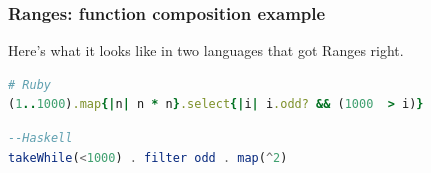 \documentclass{beamer}
\begin{document}
\begin{frame}[fragile]
\frametitle{Ranges: function composition example}

Here's what it looks like in two languages that got Ranges right.

\vspace{2em}


\vspace{1em}

\begin{lstlisting}[language=Ruby]
# Ruby
(1..1000).map{|n| n * n}.select{|i| i.odd? && (1000  > i)}
\end{lstlisting}

\begin{lstlisting}[language=Haskell]
--Haskell
takeWhile(<1000) . filter odd . map(^2)
\end{lstlisting}

\vspace{2em}
\end{frame}


\end{document}
